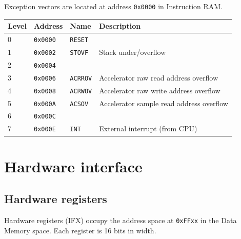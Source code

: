 \documentclass[oneside,english,a4paper,10pt,oneside,openany,final]{memoir}
\newcommand{\Address}[1]{\texttt{#1}}
\begin{document}
Exception vectors are located at address \Address{0x0000} in Instruction RAM.

\begin{table}[htb]
\centering
\begin{tabular}{|l|l|l|l|}
\hline
\textbf{Level} & \textbf{Address} & \textbf{Name}   & \textbf{Description}                      \\ \hline
0              & \Address{0x0000} & \texttt{RESET}  &                                           \\ \hline
1              & \Address{0x0002} & \texttt{STOVF}  & Stack under/overflow                      \\ \hline
2              & \Address{0x0004} &                 &                                           \\ \hline
3              & \Address{0x0006} & \texttt{ACRROV} & Accelerator raw read address overflow     \\ \hline
4              & \Address{0x0008} & \texttt{ACRWOV} & Accelerator raw write address overflow    \\ \hline
5              & \Address{0x000A} & \texttt{ACSOV}  & Accelerator sample read address overflow  \\ \hline
6              & \Address{0x000C} &                 &                                           \\ \hline
7              & \Address{0x000E} & \texttt{INT}    & External interrupt (from CPU)             \\ \hline
\end{tabular}
\end{table}

\pagebreak{}

\chapter{Hardware interface}

\section{Hardware registers}

Hardware registers (IFX) occupy the address space at \Address{0xFFxx} in the Data Memory space. Each register is 16 bits in width.
\end{document}
